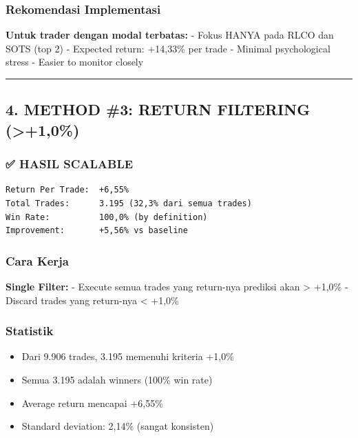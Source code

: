 \documentclass[
  10pt,
  a4paper,
]{article}
\providecommand{\tightlist}{%
  \setlength{\itemsep}{0pt}\setlength{\parskip}{0pt}}\usepackage{longtable,booktabs,array}
\begin{document}
\subsubsection{Rekomendasi Implementasi}\label{rekomendasi-implementasi}

\textbf{Untuk trader dengan modal terbatas:} - Fokus HANYA pada RLCO dan
SOTS (top 2) - Expected return: +14,33\% per trade - Minimal
psychological stress - Easier to monitor closely

\begin{center}\rule{0.5\linewidth}{0.5pt}\end{center}

\subsection{4. METHOD \#3: RETURN FILTERING
(\textgreater+1,0\%)}\label{method-3-return-filtering-10}

\subsubsection{✅ HASIL SCALABLE}\label{hasil-scalable}

\begin{verbatim}
Return Per Trade:  +6,55%
Total Trades:      3.195 (32,3% dari semua trades)
Win Rate:          100,0% (by definition)
Improvement:       +5,56% vs baseline
\end{verbatim}

\subsubsection{Cara Kerja}\label{cara-kerja-1}

\textbf{Single Filter:} - Execute semua trades yang return-nya prediksi
akan \textgreater{} +1,0\% - Discard trades yang return-nya \textless{}
+1,0\%

\subsubsection{Statistik}\label{statistik}

\begin{itemize}
\tightlist
\item
  Dari 9.906 trades, 3.195 memenuhi kriteria +1,0\%
\item
  Semua 3.195 adalah winners (100\% win rate)
\item
  Average return mencapai +6,55\%
\item
  Standard deviation: 2,14\% (sangat konsisten)
\end{itemize}
\end{document}
